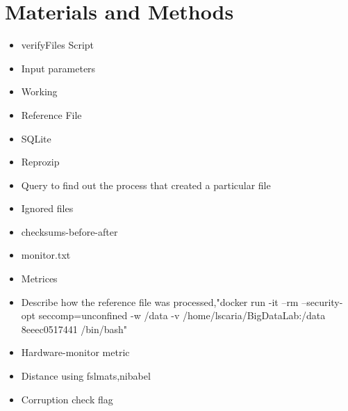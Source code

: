 \documentclass{article}
\begin{document}
\section{Materials and Methods}
\begin{itemize}
\subsection{Operating System and Applications} 
Since we are conducting a study on the influence of the changes in operating system and the underlying libraries on the biological images,we chose different versions of CentOS. CentOS is a community-driven  free software effort focused on delivering a roubust open source ecosystem. CentOS focuses on development of framework for cloud providers, the hosting community, and scientific data processing.\cite{https://www.centos.org/about/} The different versions chosen we selected for our study are centos5.11, centos6.8 and centos7.2.1511. These images are available in the official centos \url{https://hub.docker.com/\_/centos/} docker repository.

These operating system versions are base images. A base image is the image that is used to create all of your container images\url{https://www.ibm.com/support/knowledgecenter/en/SS6PEW\_9.5.0/com.ibm.help.install.omsoftware.doc/installation/c\_DockerBaseImage.html}. On top of the base images, the required software libraries were installed to create containers having all the required prerequisites and softwares.

Human Connectome Project\cite{The WU-Minn Human Connectome Project: An Overview} is a consortium led by Washington University, University of Minnesota, and Oxford University is undertaking a systematic effort to map macroscopic human brain circuits and their relationship to behavior in a large population of healthy adults.

  \item{verifyFiles Script}
  \item{Input parameters}
  \item{Working}
  \item{Reference File}
  \item{SQLite}
  \item{Reprozip}
  \item{Query to find out the process that created a particular file}
  \item{Ignored files}
  \item{checksums-before-after}
  \item{monitor.txt}
  \item{Metrices}
  \item{Describe how the reference file was processed,"docker run -it --rm --security-opt seccomp=unconfined -w /data -v /home/lscaria/BigDataLab:/data 8eeec0517441 /bin/bash"}
  \item{Hardware-monitor metric}
  \item{Distance using fslmats,nibabel}
  \item{Corruption check flag}
\end{itemize}
\end{document}
